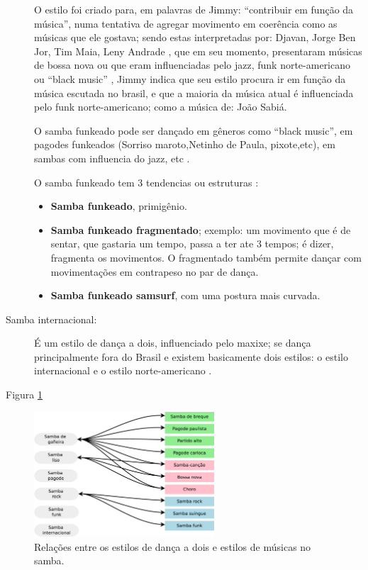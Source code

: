 \begin{description}
O estilo foi criado para, em palavras de Jimmy: ``contribuir em função da música'', 
numa tentativa de agregar movimento em coerência como as músicas que ele gostava;
sendo estas interpretadas por:
Djavan, Jorge Ben Jor, Tim Maia, Leny Andrade \cite{sambafunkeadoJimmyDeOliveiraPart1}, que em seu momento, 
presentaram músicas de bossa nova ou que eram influenciadas pelo jazz, funk norte-americano ou ``black music'' \cite{sambafunkeadoJimmyDeOliveiraPart1} \cite{sambafunkeadoJimmyDeOliveiraPart3},
Jimmy indica que seu estilo procura ir em função da música escutada no brasil, 
e que a maioria da música atual é influenciada pelo funk norte-americano;
como a música de: João Sabiá. 

O samba funkeado pode ser dançado em gêneros como ``black music'',
em pagodes funkeados (Sorriso maroto,Netinho de Paula, pixote,etc), em sambas com influencia do jazz, etc \cite{sambafunkeadoJimmyDeOliveiraPart3}.

O samba funkeado tem 3 tendencias ou estruturas  \cite{sambafunkeadoJimmyDeOliveiraPart2}:
\begin{itemize}
\item \textbf{Samba funkeado}, primigênio.
\item \textbf{Samba funkeado fragmentado}; exemplo: um movimento que é de sentar, que gastaria um tempo, 
passa a ter ate 3 tempos; é dizer, fragmenta os movimentos. 
O fragmentado também permite dançar com movimentações em contrapeso no par de dança.
\item \textbf{Samba funkeado samsurf}, com uma postura mais curvada.
\end{itemize}

 

\item[Samba internacional:] 
É um estilo de dança a dois, influenciado pelo maxixe;
se dança principalmente fora do Brasil e existem basicamente dois estilos: 
o estilo internacional e o estilo norte-americano \cite[pp. 134-135]{perna2002samba}.

\end{description}

Figura \ref{fig:sambadavavsmusica} \cite[pp. 134-138]{perna2002samba}

\begin{figure}[h]
  \centering
    \includegraphics[width=0.6\textwidth]{chapters/cap-historia-musicasamba/dancavcmusica.eps}
  \caption{Relações entre os estilos de dança a dois e estilos de músicas no samba.}
\label{fig:sambadavavsmusica}
\end{figure}

